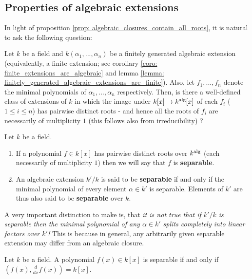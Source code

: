     \subsection{Properties of algebraic extensions}
        
        In light of proposition \ref{prop: algebraic_closures_contain_all_roots}, it is natural to ask the following question:
        \begin{question}
            Let $k$ be a field and $k(\alpha_1, ..., \alpha_n)$ be a finitely generated algebraic extension (equivalently, a finite extension; see corollary \ref{coro: finite_extensions_are_algebraic} and lemma \ref{lemma: finitely_generated_algebraic_extensions_are_finite}). Also, let $f_1, ..., f_n$ denote the minimal polynomials of $\alpha_1, ..., \alpha_n$ respectively. Then, is there a well-defined class of extensions of $k$ in which the image under $k[x] \to k^{\mathrm{alg}}[x]$ of each $f_i$ ($1 \leq i \leq n$) has pairwise distinct roots - and hence all the roots of $f_i$ are necessarily of multiplicity $1$ (this follows also from irreducibility) ?
        \end{question}
        \begin{definition} \label{def: separable_extensions} 
            Let $k$ be a field.
            \begin{enumerate}
                \item If a polynomial $f \in k[x]$ has pairwise distinct roots over $k^{\mathrm{alg}}$ (each necessarily of multiplicity $1$) then we will say that $f$ is \textbf{separable}.
                \item An algebraic extension $k'/k$ is said to be \textbf{separable} if and only if the minimal polynomial of every element $\alpha \in k'$ is separable. Elements of $k'$ are thus also said to be \textbf{separable} over $k$.
            \end{enumerate}
        \end{definition}
        \begin{remark}
            A very important distinction to make is, that \textit{it is not true that if $k'/k$ is separable then the minimal polynomial of any $\alpha \in k'$ splits completely into linear factors over $k'$!} This is because in general, any arbitrarily given separable extension may differ from an algebraic closure. 
        \end{remark}
        \begin{lemma} \label{lemma: separability_criterion_for_polynomials}
            Let $k$ be a field. A polynomial $f(x) \in k[x]$ is separable if and only if $\left(f(x), \frac{d}{dx} f(x)\right) = k[x]$.
        \end{lemma}
